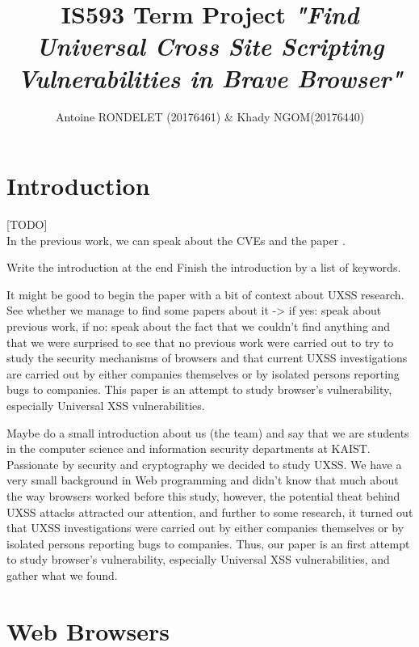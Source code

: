 \documentclass[journal]{IEEEtran}
\begin{document}
\title{IS593 Term Project \emph{"Find Universal Cross Site Scripting Vulnerabilities in Brave Browser"}}

\author{Antoine RONDELET (20176461) \& Khady NGOM(20176440)}
\maketitle
\IEEEpeerreviewmaketitle

\section{Introduction}
[TODO]\\

In the previous work, we can speak about the CVEs and the paper \cite{uxssJSLeaks}.

Write the introduction at the end
Finish the introduction by a list of keywords.

It might be good to begin the paper with a bit of context about UXSS research. See whether we manage to find some papers about it -> if yes: speak about previous work, if no: speak about the fact that we couldn't find anything and that we were surprised to see that no previous work were carried out to try to study the security mechanisms of browsers and that current UXSS investigations are carried out by either companies themselves or by isolated persons reporting bugs to companies. This paper is an attempt to study browser's vulnerability, especially Universal XSS vulnerabilities.

Maybe do a small introduction about us (the team) and say that we are students in the computer science and information security departments at KAIST. Passionate by security and cryptography we decided to study UXSS. We have a very small background in Web programming and didn't know that much about the way browsers worked before this study, however, the potential theat behind UXSS attacks attracted our attention, and further to some research, it turned out that UXSS investigations were carried out by either companies themselves or by isolated persons reporting bugs to companies. Thus, our paper is an first attempt to study browser's vulnerability, especially Universal XSS vulnerabilities, and gather what we found. 

\section{Web Browsers}
\end{document}
